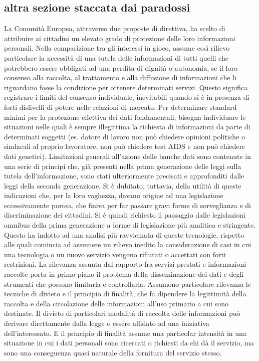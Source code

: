 \subsection{altra sezione staccata dai paradossi}
La Comunità Europea, attraverso due proposte di direttiva, ha scelto di attribuire ai cittadini un elevato grado di protezione delle loro informazioni personali.
Nella comparizione tra gli interessi in gioco, assume così rilievo particolare la necessità di una tutela delle informazioni di tutti quelli che potrebbero essere obbligati ad una perdita di dignità o autonomia, se il loro consenso alla raccolta, al trattamento e alla diffusione di informazioni che li riguardano fosse la condizione per ottenere determinati servizi.  Questo significa registrare i limiti del consenso individuale, inevitabili quando si è in presenza di forti dislivelli di potere nelle relazioni di mercato. Per determinare standard minimi per la protezione effettiva dei dati fondamentali, bisogna individuare le situazioni nelle quali è sempre illegittima la richiesta di informazioni da parte di determinati soggetti (es. datore di lavoro non può chiedere opinioni politiche o sindacali al proprio lavoratore, non può chiedere test AIDS e non può chiedere dati genetici). Limitazioni generali all’azione delle banche dati sono contenute in una serie di principi che, già presenti nella prima generazione delle leggi sulla tutela dell’informazione, sono stati ulteriormente precisati e approfonditi dalle leggi della seconda generazione. Si è dubitato, tuttavia, della utilità di queste indicazioni che, per la loro vaghezza, davano origine ad una legislazione eccessivamente porosa, che finiva per far passare gravi forme di sorveglianza e di discriminazione dei cittadini.
Si è quindi richiesto il passaggio dalle legislazioni omnibus della prima generazione a forme di legislazione più analitica e stringente. Questo ha indotto ad una analisi più ravvicinata di queste tecnologie, rispetto alle quali comincia ad assumere un rilievo inedito la considerazione di casi in cui una tecnologia o un nuovo servizio vengono rifiutati o accettati con forti restrizioni.
La rilevanza assunta dal rapporto fra servizi prestati e informazioni raccolte porta in primo piano il problema della disseminazione dei dati e degli strumenti che possono limitarla e controllarla. Assumono particolare rilevanza le tecniche di divieto e il principio di finalità, che fa dipendere la legittimità della raccolta e della circolazione delle informazioni all’uso primario a cui sono destinate. Il divieto di particolari modalità di raccolta delle informazioni può derivare direttamente dalla legge o essere affidato ad una iniziativa dell’interessato. E il principio di finalità assume una particolar intensità in una situazione in cui i dati personali sono ricercati o richiesti da chi dà il servizio, ma sono una conseguenza quasi naturale della fornitura del servizio stesso.
